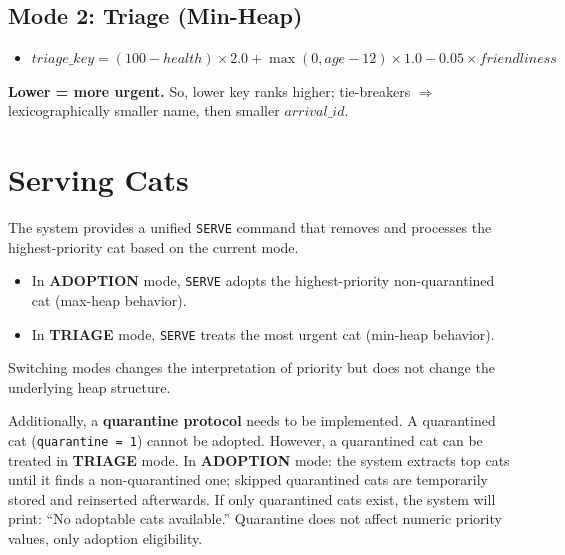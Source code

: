 \documentclass[11pt]{article}
\begin{document}
\subsection*{Mode 2: Triage (Min-Heap)}
\begin{itemize}
    \item $triage\_key = (100 - health) \times 2.0 + \max(0, age - 12) \times 1.0 - 0.05 \times friendliness$
\end{itemize}
\textbf{Lower = more urgent.} So, lower key ranks higher; tie-breakers $\Rightarrow$ lexicographically smaller name, then smaller $arrival\_id$.

\section*{Serving Cats}
The system provides a unified \texttt{SERVE} command that removes and processes the highest-priority cat based on the current mode.
\begin{itemize}
    \item In \textbf{ADOPTION} mode, \texttt{SERVE} adopts the highest-priority non-quarantined cat (max-heap behavior).
    \item In \textbf{TRIAGE} mode, \texttt{SERVE} treats the most urgent cat (min-heap behavior).
\end{itemize}
Switching modes changes the interpretation of priority but does not change the underlying heap structure.

Additionally, a \textbf{quarantine protocol} needs to be implemented. A quarantined cat (\texttt{quarantine = 1}) cannot be adopted. However, a quarantined cat can be treated in \textbf{TRIAGE} mode. In \textbf{ADOPTION} mode: the system extracts top cats until it finds a non-quarantined one; skipped quarantined cats are temporarily stored and reinserted afterwards. If only quarantined cats exist, the system will print: ``No adoptable cats available.'' Quarantine does not affect numeric priority values, only adoption eligibility.

\newpage
\end{document}
